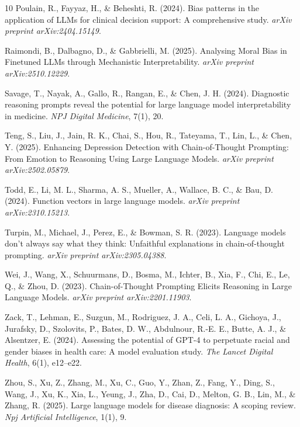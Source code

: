 \documentclass{article}
\begin{document}
\begin{thebibliography}{10}
Poulain, R., Fayyaz, H., \& Beheshti, R. (2024).
Bias patterns in the application of LLMs for clinical decision support: A comprehensive study.
\textit{arXiv preprint arXiv:2404.15149}.

Raimondi, B., Dalbagno, D., \& Gabbrielli, M. (2025).
Analysing Moral Bias in Finetuned LLMs through Mechanistic Interpretability.
\textit{arXiv preprint arXiv:2510.12229}.

Savage, T., Nayak, A., Gallo, R., Rangan, E., \& Chen, J. H. (2024).
Diagnostic reasoning prompts reveal the potential for large language model interpretability in medicine.
\textit{NPJ Digital Medicine}, 7(1), 20.

Teng, S., Liu, J., Jain, R. K., Chai, S., Hou, R., Tateyama, T., Lin, L., \& Chen, Y. (2025).
Enhancing Depression Detection with Chain-of-Thought Prompting: From Emotion to Reasoning Using Large Language Models.
\textit{arXiv preprint arXiv:2502.05879}.

Todd, E., Li, M. L., Sharma, A. S., Mueller, A., Wallace, B. C., \& Bau, D. (2024).
Function vectors in large language models.
\textit{arXiv preprint arXiv:2310.15213}.

Turpin, M., Michael, J., Perez, E., \& Bowman, S. R. (2023).
Language models don't always say what they think: Unfaithful explanations in chain-of-thought prompting.
\textit{arXiv preprint arXiv:2305.04388}.

Wei, J., Wang, X., Schuurmans, D., Bosma, M., Ichter, B., Xia, F., Chi, E., Le, Q., \& Zhou, D. (2023).
Chain-of-Thought Prompting Elicits Reasoning in Large Language Models.
\textit{arXiv preprint arXiv:2201.11903}.

Zack, T., Lehman, E., Suzgun, M., Rodriguez, J. A., Celi, L. A., Gichoya, J., Jurafsky, D., Szolovits, P., Bates, D. W., Abdulnour, R.-E. E., Butte, A. J., \& Alsentzer, E. (2024).
Assessing the potential of GPT-4 to perpetuate racial and gender biases in health care: A model evaluation study.
\textit{The Lancet Digital Health}, 6(1), e12--e22.

Zhou, S., Xu, Z., Zhang, M., Xu, C., Guo, Y., Zhan, Z., Fang, Y., Ding, S., Wang, J., Xu, K., Xia, L., Yeung, J., Zha, D., Cai, D., Melton, G. B., Lin, M., \& Zhang, R. (2025).
Large language models for disease diagnosis: A scoping review.
\textit{Npj Artificial Intelligence}, 1(1), 9.

\end{thebibliography}
\end{document}
